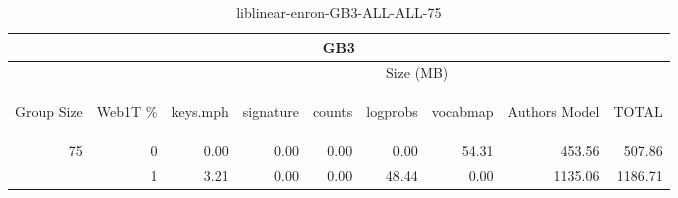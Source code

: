 \begin{center}
\begin{table}[htbp]
\begin{tabular}{ | r | r | r | r | r | r | r | r | r |}
\hline
\multicolumn{9}{|c|}{GB3}\\
\hline
 & & \multicolumn{7}{|c|}{Size (MB)}\\ \cline{3-9}
\begin{sideways}Group Size\end{sideways} & \begin{sideways}Web1T \% \end{sideways} & \begin{sideways}keys.mph\end{sideways} & \begin{sideways}signature\end{sideways} & \begin{sideways}counts\end{sideways} & \begin{sideways}logprobs\end{sideways} & \begin{sideways}vocabmap\end{sideways} & \begin{sideways}Authors Model \end{sideways} & \begin{sideways}TOTAL\end{sideways}\\
\hline
\multirow{1}{*}{75}
 & 0 & 0.00 & 0.00 & 0.00 & 0.00 & 54.31 & 453.56 & 507.86\\ \cline{2-9}
 & 1 & 3.21 & 0.00 & 0.00 & 48.44 & 0.00 & 1135.06 & 1186.71\\ \cline{2-9}
\hline
\end{tabular}
\caption{liblinear-enron-GB3-ALL-ALL-75}
\label{table:liblinear-enron-GB3-ALL-ALL-75}
\end{table}
\end{center}

